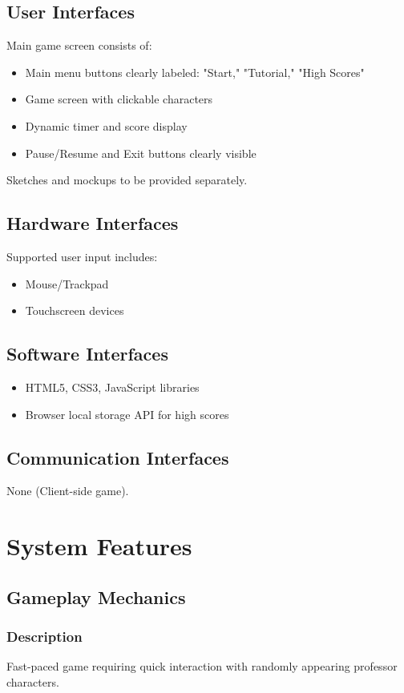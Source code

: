\documentclass{scrreprt}
\begin{document}
\section{User Interfaces}
Main game screen consists of:
\begin{itemize}
    \item Main menu buttons clearly labeled: "Start," "Tutorial," "High Scores"
    \item Game screen with clickable characters
    \item Dynamic timer and score display
    \item Pause/Resume and Exit buttons clearly visible
\end{itemize}

Sketches and mockups to be provided separately.

\section{Hardware Interfaces}
Supported user input includes:
\begin{itemize}
    \item Mouse/Trackpad
    \item Touchscreen devices
\end{itemize}

\section{Software Interfaces}
\begin{itemize}
    \item HTML5, CSS3, JavaScript libraries
    \item Browser local storage API for high scores
\end{itemize}

\section{Communication Interfaces}
None (Client-side game).

\chapter{System Features}

\section{Gameplay Mechanics}

\subsection{Description}
Fast-paced game requiring quick interaction with randomly appearing professor characters.
\end{document}
